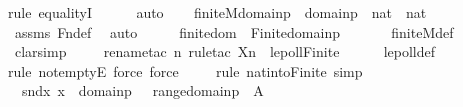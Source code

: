 \begin{isabellebody}
{\isacharparenleft}{\kern0pt}rule\ equalityI{\isacharparenright}{\kern0pt}\isanewline
\ \ \ \ \isamarkupfalse%
\ auto\isanewline
\isanewline
\ \ \isamarkupfalse%
\ {\isachardoublequoteopen}finite{\isacharunderscore}{\kern0pt}M{\isacharparenleft}{\kern0pt}domain{\isacharparenleft}{\kern0pt}p{\isacharparenright}{\kern0pt}{\isacharparenright}{\kern0pt}\ {\isasymand}\ domain{\isacharparenleft}{\kern0pt}p{\isacharparenright}{\kern0pt}\ {\isasymsubseteq}\ nat\ {\isasymtimes}\ nat{\isachardoublequoteclose}\ \isamarkupfalse%
\ assms\ Fn{\isacharunderscore}{\kern0pt}def\ \isamarkupfalse%
\ auto\isanewline
\isanewline
\ \ \isamarkupfalse%
\ \isamarkupfalse%
\ finitedom\ {\isacharcolon}{\kern0pt}\ {\isachardoublequoteopen}Finite{\isacharparenleft}{\kern0pt}domain{\isacharparenleft}{\kern0pt}p{\isacharparenright}{\kern0pt}{\isacharparenright}{\kern0pt}{\isachardoublequoteclose}\ \isanewline
\ \ \ \ \isamarkupfalse%
\ finite{\isacharunderscore}{\kern0pt}M{\isacharunderscore}{\kern0pt}def\ \ \isanewline
\ \ \ \ \isamarkupfalse%
\ clarsimp\isanewline
\ \ \ \ \isamarkupfalse%
{\isacharparenleft}{\kern0pt}rename{\isacharunderscore}{\kern0pt}tac\ n{\isacharcomma}{\kern0pt}\ rule{\isacharunderscore}{\kern0pt}tac\ X{\isacharequal}{\kern0pt}n\ \ lepoll{\isacharunderscore}{\kern0pt}Finite{\isacharparenright}{\kern0pt}\isanewline
\ \ \ \ \isamarkupfalse%
\ lepoll{\isacharunderscore}{\kern0pt}def\isanewline
\ \ \ \ \ \isamarkupfalse%
{\isacharparenleft}{\kern0pt}rule\ not{\isacharunderscore}{\kern0pt}emptyE{\isacharcomma}{\kern0pt}\ force{\isacharcomma}{\kern0pt}\ force{\isacharparenright}{\kern0pt}\isanewline
\ \ \ \ \isamarkupfalse%
{\isacharparenleft}{\kern0pt}rule\ nat{\isacharunderscore}{\kern0pt}into{\isacharunderscore}{\kern0pt}Finite{\isacharcomma}{\kern0pt}\ simp{\isacharparenright}{\kern0pt}\isanewline
\ \ \ \ \isamarkupfalse%
\isanewline
\isanewline
\ \ \isamarkupfalse%
\ {\isachardoublequoteopen}{\isacharbraceleft}{\kern0pt}\ snd{\isacharparenleft}{\kern0pt}x{\isacharparenright}{\kern0pt}{\isachardot}{\kern0pt}\ x\ {\isasymin}\ domain{\isacharparenleft}{\kern0pt}p{\isacharparenright}{\kern0pt}\ {\isacharbraceright}{\kern0pt}\ {\isacharequal}{\kern0pt}\ range{\isacharparenleft}{\kern0pt}domain{\isacharparenleft}{\kern0pt}p{\isacharparenright}{\kern0pt}{\isacharparenright}{\kern0pt}{\isachardoublequoteclose}\ {\isacharparenleft}{\kern0pt}\ {\isachardoublequoteopen}{\isacharquery}{\kern0pt}A\ {\isacharequal}{\kern0pt}\ {\isacharunderscore}{\kern0pt}{\isachardoublequoteclose}{\isacharparenright}{\kern0pt}\isanewline

\end{isabellebody}
